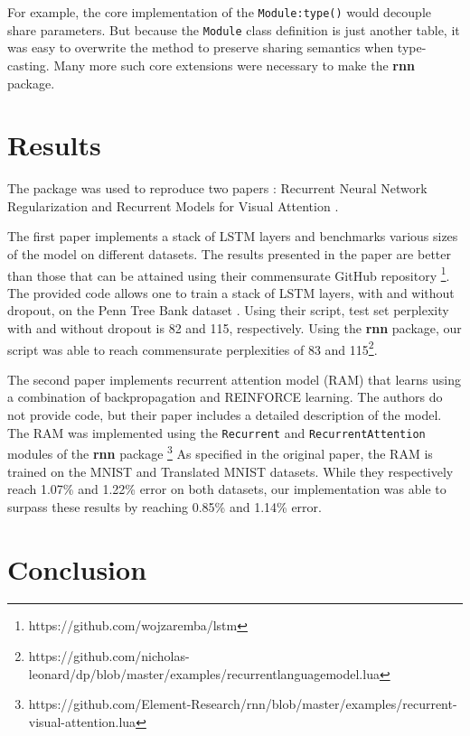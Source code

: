 \documentclass{article} %
\providecommand{\inlinecode}[1]{\texttt{#1}}
\begin{document}
For example, the core implementation of the \inlinecode{Module:type()} would 
decouple share parameters. But because the \inlinecode{Module} class definition 
is just another table, it was easy to overwrite the method to 
preserve sharing semantics when type-casting. Many more such core extensions were 
necessary to make the \textbf{rnn} package.

\section{Results}

The package was used to reproduce two papers :
Recurrent Neural Network Regularization \cite{zaremba2014recurrent}
and Recurrent Models for Visual Attention \cite{mnih2014recurrent}.

The first paper implements a stack of LSTM layers \cite{hinton2012improving}
and benchmarks various sizes of the model on different datasets.
The results presented in the paper are better than 
those that can be attained using their commensurate GitHub repository 
\footnote{https://github.com/wojzaremba/lstm}. 
The provided code allows one to train a stack of LSTM layers, 
with and without dropout, 
on the Penn Tree Bank dataset \cite{marcus1993building}.
Using their script, test set perplexity
with and without dropout is 82 and 115, respectively.
Using the \textbf{rnn} package, our script was able to reach 
commensurate perplexities of 83 and 115\footnote{https://github.com/nicholas-leonard/dp/blob/master/examples/recurrentlanguagemodel.lua}.

The second paper implements recurrent attention model (RAM) that 
learns using a combination of backpropagation and REINFORCE\cite{williams1992simple} learning.
The authors do not provide code, but their paper includes a detailed 
description of the model.
The RAM was implemented using the \inlinecode{Recurrent} and \inlinecode{RecurrentAttention}
modules of the \textbf{rnn} package 
\footnote{https://github.com/Element-Research/rnn/blob/master/examples/recurrent-visual-attention.lua}
As specified in the original paper, the RAM is trained on the MNIST \cite{lecun1998mnist} and Translated MNIST datasets.
While they respectively reach 1.07\% and 1.22\% error on both datasets, 
our implementation was able to surpass these results by reaching 0.85\% and 1.14\% error.


\section{Conclusion}
\end{document}
